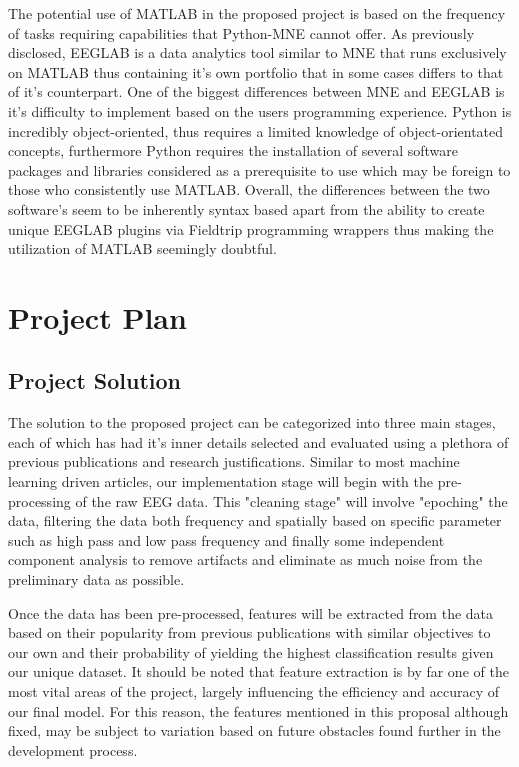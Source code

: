 \documentclass[12pt]{article}
\begin{document}
The potential use of MATLAB in the proposed project is based on the frequency of tasks requiring capabilities that Python-MNE cannot offer. As previously disclosed, EEGLAB is a data analytics tool similar to MNE that runs exclusively on MATLAB thus containing it's own portfolio that in some cases differs to that of it's counterpart. One of the biggest differences between MNE and EEGLAB is  it's difficulty to implement based on the users programming experience. Python is incredibly object-oriented, thus requires a limited knowledge of object-orientated concepts, furthermore Python requires the installation of several software packages and libraries considered as a prerequisite to use which may be foreign to those who consistently use MATLAB. Overall, the differences between the two software's seem to be inherently syntax based apart from the ability to create unique EEGLAB plugins via Fieldtrip programming wrappers thus making the utilization of MATLAB seemingly doubtful.

\section{Project Plan}
\subsection{Project Solution}
The solution to the proposed project can be categorized into three main stages, each of which has had it's inner details selected and evaluated using a plethora of previous publications and research justifications. Similar to most machine learning driven articles, our implementation stage will begin with the pre-processing of the raw EEG data. This "cleaning stage" will involve "epoching" the data, filtering the data both frequency and spatially based on specific parameter such as high pass and low pass frequency and finally some independent component analysis to remove artifacts and eliminate as much noise from the preliminary data as possible.

Once the data has been pre-processed, features will be extracted from the data based on their popularity from previous publications with similar objectives to our own and their probability of yielding the highest classification results given our unique dataset. It should be noted that feature extraction is by far one of the most vital areas of the project, largely influencing the efficiency and accuracy of our final model. For this reason, the features mentioned in this proposal although fixed, may be subject to variation based on future obstacles found further in the development process. 
\end{document}
